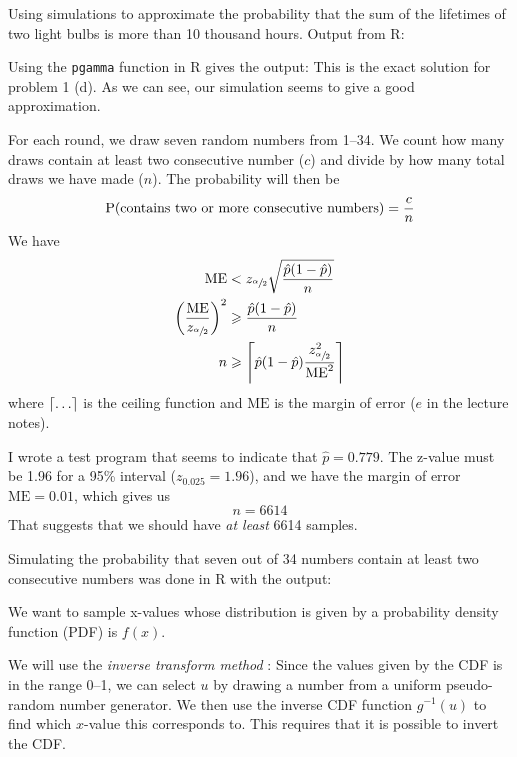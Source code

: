 \documentclass[a4paper,english,12pt]{article}
\begin{document}
Using simulations to approximate the probability that the sum of the lifetimes
of two light bulbs is more than 10 thousand hours. Output from R:

Using the \texttt{pgamma} function in R gives the output:
This is the exact solution for problem 1 (d). As we can see, our simulation
seems to give a good approximation.

For each round, we draw seven random numbers from 1--34. We count how many
draws contain at least two consecutive number ($c$) and divide by how many
total draws we have made ($n$). The probability will then be
\[
  \Prb(\text{contains two or more consecutive numbers}) = \frac{c}{n}
\]
We have
\begin{align*}
  \text{ME} &< z_{\sfrac{\alpha}{2}}\sqrt{\frac{\hat{p}(1-\hat{p})}{n}} \\
  \left(\frac{\text{ME}}{z_{\sfrac{\alpha}{2}}}\right)^2 &\geqslant \frac{\hat{p}(1-\hat{p})}{n} \\
  n &\geqslant \ceil*{ \hat{p}(1-\hat{p}) \frac{z_{\sfrac{\alpha}{2}}^2}{\text{ME}^2} }
\end{align*}
where $\ceil{\dots}$ is the ceiling function and $\text{ME}$ is the margin of
error ($e$ in the lecture notes).

I wrote a test program that seems to indicate that $\hat{p} = 0.779$. The
z-value must be 1.96 for a 95\%{} interval ($z_{0.025} = 1.96$), and we
have the margin of error $\text{ME} = 0.01$, which gives us
\[
  n = 6614
\]
That suggests that we should have \textit{at least} 6614 samples.

Simulating the probability that seven out of 34 numbers contain at least two
consecutive numbers was done in R with the output:

\label{problem:3a}
We want to sample x-values whose distribution is given by a probability density
function (PDF) is $f(x)$.

We will use the \textit{inverse transform method}
\cite{wiki:inverse.transform.method}: Since the values given by the CDF is in
the range 0--1, we can select $u$ by drawing a number from a uniform
pseudo-random number generator. We then use the inverse CDF function
$g^{-1}(u)$ to find which $x$-value this corresponds to. This requires that it
is possible to invert the CDF.
\end{document}
